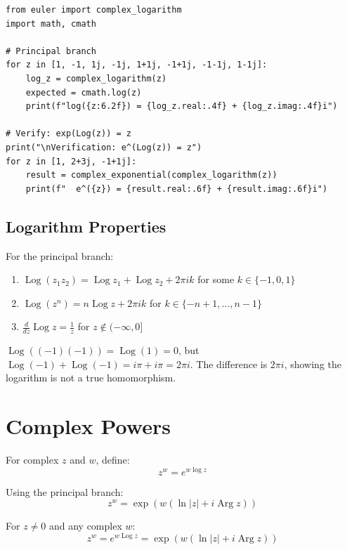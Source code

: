 \begin{lstlisting}[caption={Complex logarithm}, label=lst:complex_log]
from euler import complex_logarithm
import math, cmath

# Principal branch
for z in [1, -1, 1j, -1j, 1+1j, -1+1j, -1-1j, 1-1j]:
    log_z = complex_logarithm(z)
    expected = cmath.log(z)
    print(f"log({z:6.2f}) = {log_z.real:.4f} + {log_z.imag:.4f}i")

# Verify: exp(Log(z)) = z
print("\nVerification: e^(Log(z)) = z")
for z in [1, 2+3j, -1+1j]:
    result = complex_exponential(complex_logarithm(z))
    print(f"  e^({z}) = {result.real:.6f} + {result.imag:.6f}i")
\end{lstlisting}

\subsection{Logarithm Properties}

\begin{theorem}
For the principal branch:
\begin{enumerate}
\item $\operatorname{Log}(z_1 z_2) = \operatorname{Log} z_1 + \operatorname{Log} z_2 + 2\pi i k$ for some $k \in \{-1, 0, 1\}$
\item $\operatorname{Log}(z^n) = n \operatorname{Log} z + 2\pi i k$ for $k \in \{-n+1, \ldots, n-1\}$
\item $\frac{d}{dz} \operatorname{Log} z = \frac{1}{z}$ for $z \notin (-\infty, 0]$
\end{enumerate}
\end{theorem}

\begin{example}
$\operatorname{Log}((-1)(-1)) = \operatorname{Log}(1) = 0$, but $\operatorname{Log}(-1) + \operatorname{Log}(-1) = i\pi + i\pi = 2\pi i$.
The difference is $2\pi i$, showing the logarithm is not a true homomorphism.
\end{example}

\section{Complex Powers}

For complex $z$ and $w$, define:
\[
z^w = e^{w \log z}
\]

Using the principal branch:
\[
z^w = \exp(w (\ln|z| + i \operatorname{Arg} z))
\]

\begin{theorem}
For $z \neq 0$ and any complex $w$:
\[
z^w = e^{w \operatorname{Log} z} = \exp(w(\ln|z| + i \operatorname{Arg} z))
\]
\end{theorem}

